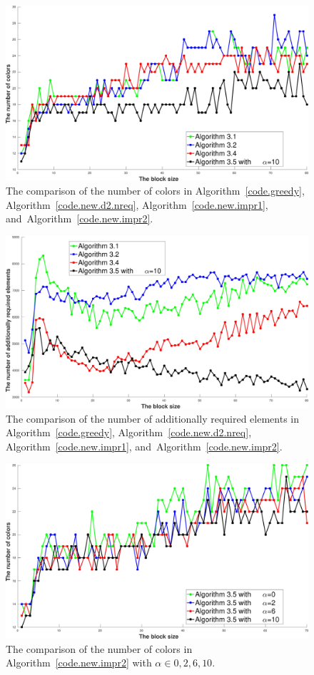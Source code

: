 \documentclass[12pt, twoside,a4paper,toc=bibliography]{scrbook}
\newcommand{\coderef}[1]{Algorithm~\protect\ref{#1}}
\begin{document}
\begin{figure}
\centering
\includegraphics[width=0.9\linewidth]{ex33_alg31_alg32_alg34_alg35_bls_lfo_cols}
\caption{
The comparison of the number of colors in \coderef{code.greedy},  \coderef{code.new.d2.nreq},
\coderef{code.new.impr1}, and~\coderef{code.new.impr2}.}
\label{ex33_alg31_alg32_alg34_alg35_bls_lfo_cols}
\end{figure}

\begin{figure}
\centering
\includegraphics[width=0.9\linewidth]{ex33_alg31_alg32_alg34_alg35_bls_lfo_adds}
\caption{
The comparison of the number of additionally required elements in \coderef{code.greedy},  \coderef{code.new.d2.nreq},
\coderef{code.new.impr1}, and~\coderef{code.new.impr2}.}
\label{ex33_alg31_alg32_alg34_alg35_bls_lfo_adds}
\end{figure}

\begin{figure}
\centering
\includegraphics[width=0.9\linewidth]{ex33_alg35_alpha_0_2_6_10_bls_lfo_cols}
\caption{
The comparison of the number of colors in \coderef{code.new.impr2}
with $\alpha\in{0,2,6,10}$.}
\label{ex33_alg35_alpha_0_2_6_10_bls_lfo_cols}
\end{figure}
\end{document}
